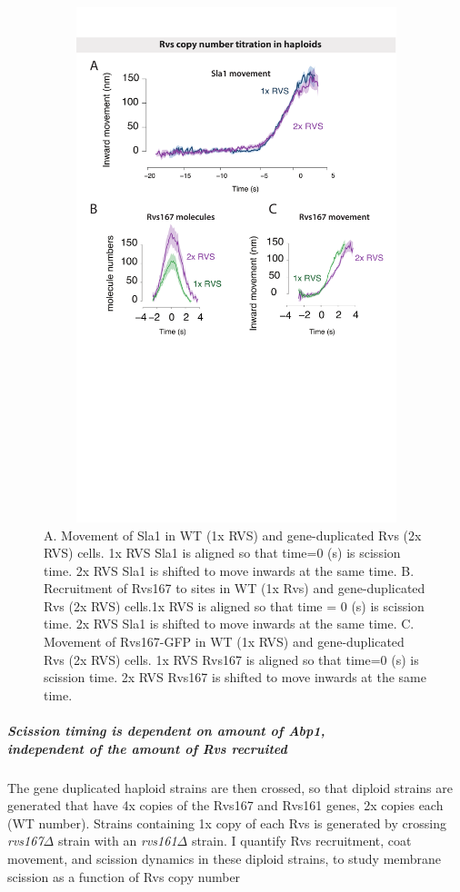 			\begin{figure}[h]
			\centering
			\includegraphics[width=15cm,height=15cm,keepaspectratio]{figures/results_final/rvs_haploid}
			\caption[Overexpression of the Rvs complex in haploid cells]
			{A. Movement of Sla1 in WT (1x RVS) and gene-duplicated Rvs (2x RVS) cells. 1x RVS Sla1 is aligned so that time=0 (s) is scission time. 2x RVS Sla1 is shifted to move inwards at the same time.
			B. Recruitment of Rvs167 to sites in WT (1x Rvs)  and gene-duplicated Rvs (2x RVS) cells.1x RVS is aligned so that time = 0 (s) is scission time. 2x RVS Sla1 is shifted to move inwards at the same time.
			C.  Movement of Rvs167-GFP in WT (1x RVS) and gene-duplicated Rvs (2x RVS) cells. 1x RVS Rvs167 is aligned so that time=0 (s) is scission time. 2x RVS Rvs167 is shifted to move inwards at the same time.
			 \label{fig_rvshaploid}}
			\end{figure}	
		

	

	\subparagraph{Scission timing is dependent on amount of Abp1, \\
	independent of the amount of Rvs recruited}
	\vspace{5mm}
	The gene duplicated haploid strains are then crossed, so that diploid strains are generated that have 4x copies of the Rvs167 and Rvs161 genes, 2x copies each (WT number). Strains containing 1x copy of each Rvs is generated by crossing \textit{rvs167$\Delta$} strain with an \textit{rvs161$\Delta$} strain. I quantify Rvs recruitment, coat movement, and scission dynamics in these diploid strains, to study membrane scission as a function of Rvs copy number
	
